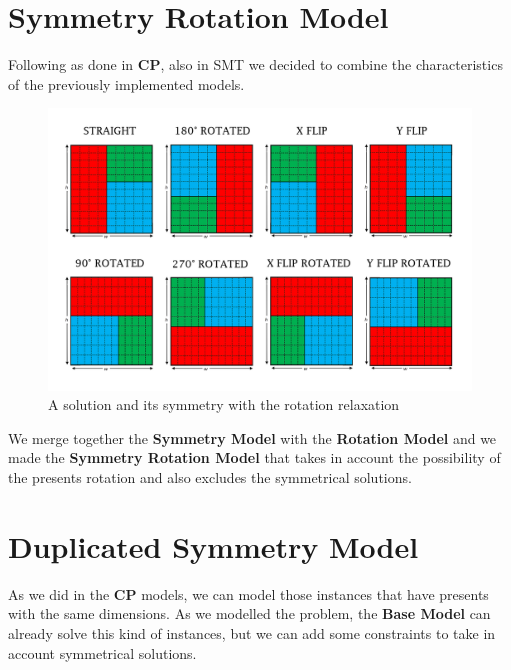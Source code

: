 

\newpage
\section{Symmetry Rotation Model}
Following as done in \textbf{CP}, also in SMT we decided to combine the characteristics of the previously implemented models.

\begin{figure}[ht]
	\centering
	\includegraphics[width=\textwidth]{images/rotated_simmetry.png}
	\caption{A solution and its symmetry with the rotation relaxation}
	\label{fig:overlaps}
\end{figure}

We merge together the \textbf{Symmetry Model} with the \textbf{Rotation Model} and we made
the \textbf{Symmetry Rotation Model} that takes in account the possibility of the presents rotation and also excludes the symmetrical
solutions.



\newpage
\section{Duplicated Symmetry Model}
As we did in the \textbf{CP} models, we can model those instances that have presents with the same dimensions. As we modelled the problem,
the \textbf{Base Model} can already solve this kind of instances, but we can add some constraints to take in account symmetrical solutions.


